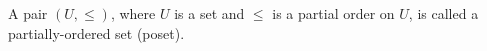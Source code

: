 A pair $(U, \leq)$, where $U$ is a set and $\leq$ is a partial order on $U$, is called a partially-ordered set (poset).
